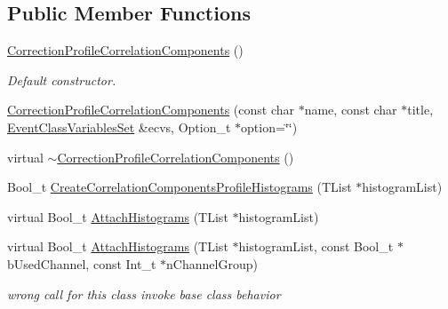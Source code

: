 \subsection*{Public Member Functions}
\begin{DoxyCompactItemize}
\item 
\mbox{\label{classQn_1_1CorrectionProfileCorrelationComponents_ab632ed867cbc51d05116486cf2bb3dd3}} 
\mbox{\hyperlink{classQn_1_1CorrectionProfileCorrelationComponents_ab632ed867cbc51d05116486cf2bb3dd3}{Correction\+Profile\+Correlation\+Components}} ()
\begin{DoxyCompactList}\small\item\em Default constructor. \end{DoxyCompactList}\item 
\mbox{\hyperlink{classQn_1_1CorrectionProfileCorrelationComponents_aae547ab6d47a7008904a05045fbcd4bf}{Correction\+Profile\+Correlation\+Components}} (const char $\ast$name, const char $\ast$title, \mbox{\hyperlink{classQn_1_1EventClassVariablesSet}{Event\+Class\+Variables\+Set}} \&ecvs, Option\+\_\+t $\ast$option=\char`\"{}\char`\"{})
\item 
virtual \mbox{\hyperlink{classQn_1_1CorrectionProfileCorrelationComponents_a172ec5effe44c5e2eb40da82c8a56bb0}{$\sim$\+Correction\+Profile\+Correlation\+Components}} ()
\item 
Bool\+\_\+t \mbox{\hyperlink{classQn_1_1CorrectionProfileCorrelationComponents_ad9ec714a26cdc2c76eb5be288f6f114e}{Create\+Correlation\+Components\+Profile\+Histograms}} (T\+List $\ast$histogram\+List)
\item 
virtual Bool\+\_\+t \mbox{\hyperlink{classQn_1_1CorrectionProfileCorrelationComponents_af2faa01d08373d0cb2e5631776729989}{Attach\+Histograms}} (T\+List $\ast$histogram\+List)
\item 
\mbox{\label{classQn_1_1CorrectionProfileCorrelationComponents_ae6724df1041ef1049e2c7649c2e58d06}} 
virtual Bool\+\_\+t \mbox{\hyperlink{classQn_1_1CorrectionProfileCorrelationComponents_ae6724df1041ef1049e2c7649c2e58d06}{Attach\+Histograms}} (T\+List $\ast$histogram\+List, const Bool\+\_\+t $\ast$b\+Used\+Channel, const Int\+\_\+t $\ast$n\+Channel\+Group)
\begin{DoxyCompactList}\small\item\em wrong call for this class invoke base class behavior \end{DoxyCompactList}\item 

\end{DoxyCompactItemize}
